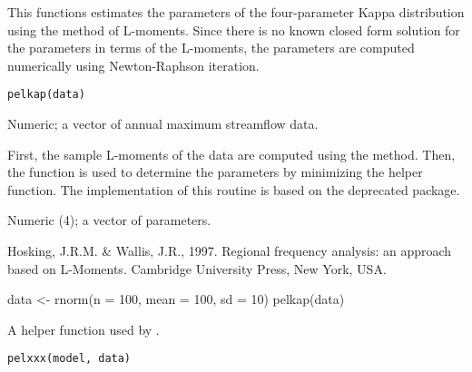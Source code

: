 \documentclass[a4paper]{book}
\begin{document}
%
\begin{Description}
This functions estimates the parameters of the four-parameter Kappa distribution using
the method of L-moments. Since there is no known closed form solution for the parameters
in terms of the L-moments, the parameters are computed numerically using Newton-Raphson
iteration.
\end{Description}
%
\begin{Usage}
\begin{verbatim}
pelkap(data)
\end{verbatim}
\end{Usage}
%
\begin{Arguments}
\begin{ldescription}
\item[\code{data}] Numeric; a vector of annual maximum streamflow data.
\end{ldescription}
\end{Arguments}
%
\begin{Details}
First, the sample L-moments of the data are computed using the 
method. Then, the  function is used to determine the
parameters by minimizing the  helper function. The implementation of
this routine is based on the deprecated  package.
\end{Details}
%
\begin{Value}
Numeric (4); a vector of parameters.
\end{Value}
%
\begin{References}
Hosking, J.R.M. \& Wallis, J.R., 1997. Regional frequency analysis: an approach based
on L-Moments. Cambridge University Press, New York, USA.
\end{References}
%
\begin{Examples}
\begin{ExampleCode}
data <- rnorm(n = 100, mean = 100, sd = 10)
pelkap(data)

\end{ExampleCode}
\end{Examples}
%
\begin{Description}
A helper function used by .
\end{Description}
%
\begin{Usage}
\begin{verbatim}
pelxxx(model, data)
\end{verbatim}
\end{Usage}
\end{document}
